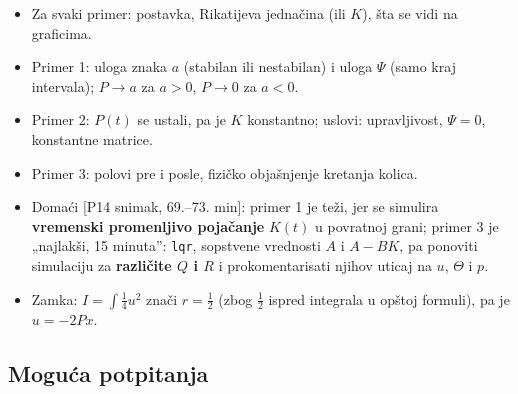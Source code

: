 \documentclass[11pt,a4paper,parskip=half,headsepline,numbers=noenddot]{scrartcl}
\DeclareRobustCommand{\izvor}[1]{{\small\color{izvorC}[#1]}}
\begin{document}
\begin{ispit}[{Pitanje 12}]
\begin{itemize}
\item Za svaki primer: postavka, Rikatijeva jednačina (ili \(K\)), šta se vidi na graficima.
\item Primer 1: uloga znaka \(a\) (stabilan ili nestabilan) i uloga \(\Psi\) (samo kraj intervala); \(P \to a\) za \(a > 0\), \(P \to 0\) za \(a < 0\).
\item Primer 2: \(P(t)\) se ustali, pa je \(K\) konstantno; uslovi: upravljivost, \(\Psi = 0\), konstantne matrice.
\item Primer 3: polovi pre i posle, fizičko objašnjenje kretanja kolica.
\item Domaći \izvor{P14 snimak, 69.--73. min}: primer 1 je teži, jer se simulira \textbf{vremenski promenljivo pojačanje} \(K(t)\) u povratnoj grani; primer 3 je „najlakši, 15 minuta'': \texttt{lqr}, sopstvene vrednosti \(A\) i \(A - BK\), pa ponoviti simulaciju za \textbf{različite \(Q\) i \(R\)} i prokomentarisati njihov uticaj na \(u\), \(\Theta\) i \(p\).
\item Zamka: \(I = \int\frac14u^2\) znači \(r = \frac12\) (zbog \(\frac12\) ispred integrala u opštoj formuli), pa je \(u = -2Px\).
\end{itemize}
\end{ispit}

\subsection{Moguća potpitanja}
\end{document}
